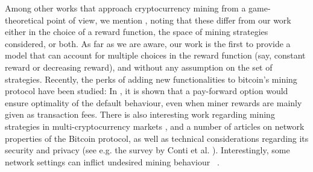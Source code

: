 \documentclass[a4paper,english,cleveref, autoref,numberwithinsect]{lipics-v2019}
\begin{document}
Among other works that approach cryptocurrency mining from a game-theoretical point of view, we mention \cite{economics_of_mining2013,instabilitywithoutreward:2016}, noting that these differ from our work either in the choice of 
a reward function, the space of mining strategies considered, or both. 
As far as we are aware, our work is the first to provide a model that can account for multiple choices in the reward function (say, constant reward or decreasing reward), and without any assumption on the set of strategies.  Recently, the perks of adding new functionalities to bitcoin's mining protocol have been studied: In \cite{koutsoupias2018blockchain}, it is shown that a pay-forward option would ensure optimality of the default behaviour, even when miner rewards are mainly given as transaction fees.
There is also interesting work regarding mining strategies in multi-cryptocurrency markets \cite{dhamal2018stochastic,spiegelman2018game}, and a number of articles on network properties of the Bitcoin protocol, as well as technical considerations regarding its security and privacy (see e.g. the survey by Conti et al. \cite{conti2018survey}). Interestingly, 
some network settings can inflict undesired mining behaviour ~\cite{bitcoin_attacks_2013,ddos_attacks2014,empirical_dos_attacks2014}.   
\end{document}
